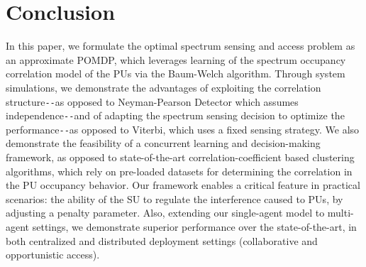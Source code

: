 \documentclass[12pt, draftcls, onecolumn]{IEEEtran}
\begin{document}
\section{Conclusion}\label{V}
In this paper, we formulate the optimal spectrum sensing and access problem as an approximate POMDP, which leverages learning of the spectrum occupancy correlation model of the PUs via the Baum-Welch algorithm. Through system simulations, we demonstrate the advantages of exploiting the correlation structure\texttt{-{}-}as opposed to Neyman-Pearson Detector which assumes independence\texttt{-{}-}and of adapting the spectrum sensing decision to optimize the performance\texttt{-{}-}as opposed to Viterbi, which uses a fixed sensing strategy. We also demonstrate the feasibility of a concurrent learning and decision-making framework, as opposed to state-of-the-art correlation-coefficient based clustering algorithms, which rely on pre-loaded datasets for determining the correlation in the PU occupancy behavior. Our framework enables a critical feature in practical scenarios: the ability of the SU to regulate the interference caused to PUs, by adjusting a penalty parameter. Also, extending our single-agent model to multi-agent settings, we demonstrate superior performance over the state-of-the-art, in both centralized and distributed deployment settings (collaborative and opportunistic access).


\end{document}
